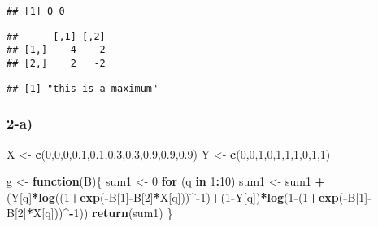 \documentclass[
]{article}
\newenvironment{Shaded}{\begin{snugshade}}{\end{snugshade}}
\newcommand{\ControlFlowTok}[1]{\textcolor[rgb]{0.13,0.29,0.53}{\textbf{#1}}}
\newcommand{\DecValTok}[1]{\textcolor[rgb]{0.00,0.00,0.81}{#1}}
\newcommand{\FloatTok}[1]{\textcolor[rgb]{0.00,0.00,0.81}{#1}}
\newcommand{\FunctionTok}[1]{\textcolor[rgb]{0.13,0.29,0.53}{\textbf{#1}}}
\newcommand{\NormalTok}[1]{#1}
\newcommand{\OtherTok}[1]{\textcolor[rgb]{0.56,0.35,0.01}{#1}}
\newcommand{\SpecialCharTok}[1]{\textcolor[rgb]{0.81,0.36,0.00}{\textbf{#1}}}
\begin{document}
\begin{verbatim}
## [1] 0 0
\end{verbatim}

\begin{verbatim}
##      [,1] [,2]
## [1,]   -4    2
## [2,]    2   -2
\end{verbatim}

\begin{verbatim}
## [1] "this is a maximum"
\end{verbatim}

\hypertarget{a-3}{%
\subsubsection{2-a)}\label{a-3}}

\begin{Shaded}
\begin{Highlighting}[]
\NormalTok{X }\OtherTok{\textless{}{-}} \FunctionTok{c}\NormalTok{(}\DecValTok{0}\NormalTok{,}\DecValTok{0}\NormalTok{,}\DecValTok{0}\NormalTok{,}\FloatTok{0.1}\NormalTok{,}\FloatTok{0.1}\NormalTok{,}\FloatTok{0.3}\NormalTok{,}\FloatTok{0.3}\NormalTok{,}\FloatTok{0.9}\NormalTok{,}\FloatTok{0.9}\NormalTok{,}\FloatTok{0.9}\NormalTok{)}
\NormalTok{Y }\OtherTok{\textless{}{-}} \FunctionTok{c}\NormalTok{(}\DecValTok{0}\NormalTok{,}\DecValTok{0}\NormalTok{,}\DecValTok{1}\NormalTok{,}\DecValTok{0}\NormalTok{,}\DecValTok{1}\NormalTok{,}\DecValTok{1}\NormalTok{,}\DecValTok{1}\NormalTok{,}\DecValTok{0}\NormalTok{,}\DecValTok{1}\NormalTok{,}\DecValTok{1}\NormalTok{)}

\NormalTok{g }\OtherTok{\textless{}{-}} \ControlFlowTok{function}\NormalTok{(B)\{}
\NormalTok{  sum1 }\OtherTok{\textless{}{-}} \DecValTok{0}
  \ControlFlowTok{for}\NormalTok{ (q }\ControlFlowTok{in} \DecValTok{1}\SpecialCharTok{:}\DecValTok{10}\NormalTok{)}
\NormalTok{    sum1 }\OtherTok{\textless{}{-}}\NormalTok{ sum1 }\SpecialCharTok{+}\NormalTok{ (Y[q]}\SpecialCharTok{*}\FunctionTok{log}\NormalTok{((}\DecValTok{1}\SpecialCharTok{+}\FunctionTok{exp}\NormalTok{(}\SpecialCharTok{{-}}\NormalTok{B[}\DecValTok{1}\NormalTok{]}\SpecialCharTok{{-}}\NormalTok{B[}\DecValTok{2}\NormalTok{]}\SpecialCharTok{*}\NormalTok{X[q]))}\SpecialCharTok{\^{}{-}}\DecValTok{1}\NormalTok{)}\SpecialCharTok{+}\NormalTok{(}\DecValTok{1}\SpecialCharTok{{-}}\NormalTok{Y[q])}\SpecialCharTok{*}\FunctionTok{log}\NormalTok{(}\DecValTok{1}\SpecialCharTok{{-}}\NormalTok{(}\DecValTok{1}\SpecialCharTok{+}\FunctionTok{exp}\NormalTok{(}\SpecialCharTok{{-}}\NormalTok{B[}\DecValTok{1}\NormalTok{]}\SpecialCharTok{{-}}\NormalTok{B[}\DecValTok{2}\NormalTok{]}\SpecialCharTok{*}\NormalTok{X[q]))}\SpecialCharTok{\^{}{-}}\DecValTok{1}\NormalTok{))}
  \FunctionTok{return}\NormalTok{(sum1)}
\NormalTok{\}}


\end{Highlighting}
\end{Shaded}
\end{document}
